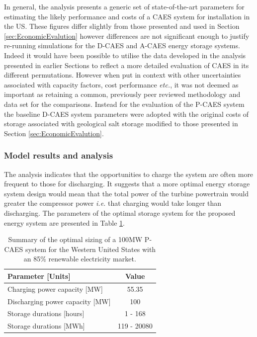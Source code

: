 \documentclass[preprint,12pt]{elsarticle}
\begin{document}
In general, the analysis \cite{HUNTER20212077} presents a generic set of state-of-the-art parameters for estimating the likely performance and costs of a CAES system for installation in the US. These figures differ slightly from those presented and used in Section \ref{sec:EconomicEvalution} however differences are not significant enough to justify re-running simulations for the D-CAES and A-CAES energy storage systems. Indeed it would have been possible to utilise the data developed in the analysis presented in earlier Sections to reflect a more detailed evaluation of CAES in its different permutations. However when put in context with other uncertainties associated with capacity factors, cost performance \textit{etc.}, it was not deemed as important as retaining a common, previously peer reviewed methodology and data set for the comparisons. Instead for the evaluation of the P-CAES system the baseline D-CAES system parameters were adopted with the original costs of storage associated with geological salt storage modified to those presented in Section \ref{sec:EconomicEvalution}.

\subsubsection{Model results and analysis}  

The analysis indicates that the opportunities to charge the system are often more frequent to those for discharging. It suggests that a more optimal energy storage system design would mean that the total power of the turbine powertrain would greater the compressor power \textit{i.e.} that charging would take longer than discharging. The parameters of the optimal storage system for the proposed energy system are presented in Table \ref{tab:CounterfactualP_CAES}.

\begin{table}[h]
\centering
\begin{tabular}{l c}
\toprule
\textbf{Parameter [Units]} & \textbf{Value}\\
\midrule
Charging power capacity [MW] & 55.35 \\
Discharging power capacity [MW]	& 100 \\
Storage durations [hours] & 1 - 168\\
Storage durations [MWh] & 119 - 20080\\
\bottomrule
\end{tabular}
\caption{Summary of the optimal sizing of a 100MW P-CAES system for the Western United States with an 85\% renewable electricity market.}

\label{tab:CounterfactualP_CAES} %
\end{table}
\end{document}
